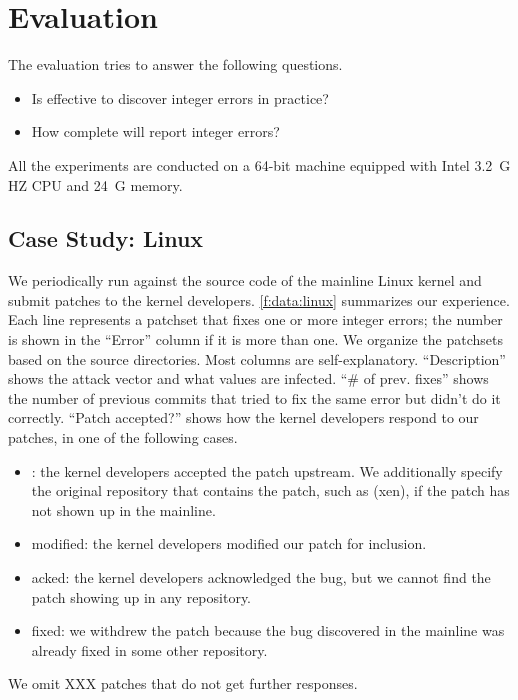 \section{Evaluation}
\label{s:eval}

The evaluation tries to answer the following questions.
\begin{itemize}
\item
Is \sys effective to discover integer errors in practice?
\item
How complete will \sys report integer errors?
\end{itemize}

All the experiments are conducted on a 64-bit machine equipped with
Intel 3.2~G HZ CPU and 24~G memory.

\subsection{Case Study: Linux}
\label{s:eval:linux}

We periodically run \sys against the source code of the mainline
Linux kernel and submit patches to the kernel developers.
\autoref{f:data:linux} summarizes our experience.  Each line
represents a patchset that fixes one or more integer errors; the
number is shown in the ``Error'' column if it is more than one.  We
organize the patchsets based on the source directories.  Most
columns are self-explanatory.  ``Description'' shows the attack
vector and what values are infected.  ``\# of prev. fixes'' shows
the number of previous commits that tried to fix the same error but
didn't do it correctly.  ``Patch accepted?'' shows how the kernel
developers respond to our patches, in one of the following cases.
\begin{itemize}
\item
\ok: the kernel developers accepted the patch upstream.  We
additionally specify the original repository that contains the
patch,  such as (xen), if the patch has not shown up in the mainline.
\item
modified: the kernel developers modified our patch for inclusion.
\item
acked: the kernel developers acknowledged the bug,
but we cannot find the patch showing up in any repository.
\item
fixed: we withdrew the patch because the bug discovered in the
mainline was already fixed in some other repository.
\end{itemize}
We omit XXX patches that do not get further responses.

